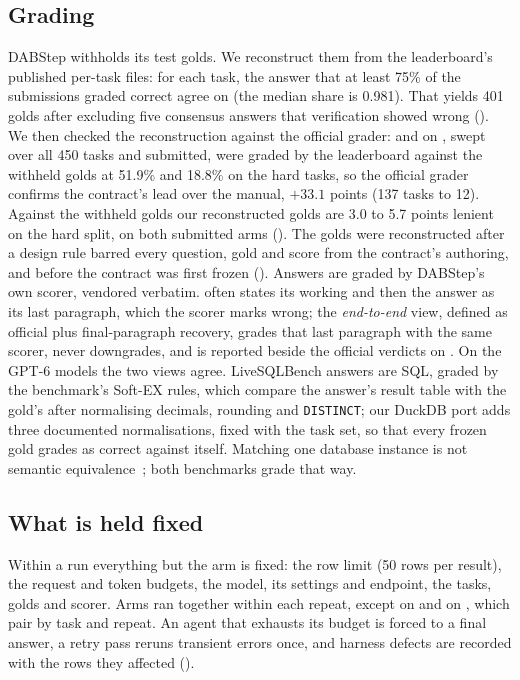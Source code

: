 \subsection{Grading}
\label{sec:grading}
\label{sec:golds}

DABStep withholds its test golds. We reconstruct them from the
leaderboard's published per-task files: for each task, the answer that at
least 75\% of the submissions graded correct agree on (the median share is
0.981). That yields 401 golds after excluding five consensus answers that
verification showed wrong (). We then checked the
reconstruction against the official grader: \armC{} and \armM{} on
\mGLM{}, swept over all 450 tasks and submitted, were graded by the
leaderboard against the withheld golds at 51.9\% and 18.8\% on the hard
tasks, so the official grader confirms the contract's lead over the
manual, $+33.1$ points (137 tasks to 12). Against the withheld golds our
reconstructed golds are 3.0 to 5.7 points lenient on the hard split, on
both submitted arms (). The golds were reconstructed
after a design rule barred every question, gold and score from the
contract's authoring, and before the contract was first frozen
(). Answers are graded by
DABStep's own scorer, vendored verbatim. \mQwen{} often states its working
and then the answer as its last paragraph, which the scorer marks wrong;
the \emph{end-to-end} view, defined as official plus final-paragraph
recovery, grades that last paragraph with the same scorer, never
downgrades, and is reported beside the official verdicts on \mQwen{}. On
the GPT-6 models the two views agree. LiveSQLBench answers
are SQL, graded by the benchmark's Soft-EX rules, which compare the
answer's result table with the gold's after normalising decimals, rounding
and \texttt{DISTINCT}; our DuckDB port adds three documented
normalisations, fixed with the task set, so that every frozen gold grades
as correct against itself. Matching one database
instance is not semantic equivalence~\cite{test-suites}; both benchmarks
grade that way.

\subsection{What is held fixed}
\label{sec:fixed}

Within a run everything but the arm is fixed: the row limit (50 rows per
result), the request and token budgets, the model, its settings and
endpoint, the tasks, golds and scorer. Arms ran together within each
repeat, except \armMw{} on \mSol{} and \armMws{} on \mLuna{}, which pair by
task and repeat. An agent that exhausts its budget is forced to a final
answer, a retry pass reruns transient errors once, and harness defects are
recorded with the rows they affected ().
